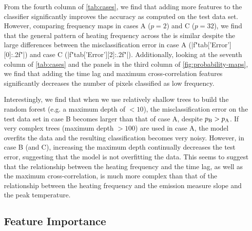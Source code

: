 From the fourth column of \autoref{tab:cases}, we find that adding more features to the classifier significantly improves the accuracy as computed on the test data set.
However, comparing frequency maps in cases A ($p=2$) and C ($p=32$), we find that the general pattern of heating frequency across the \AR{} is similar despite the large differences between the misclassification error in case A (\py[manager_ml]|f"{tab['Error'][0]:.2f}"|) and case C (\py[manager_ml]|f"{tab['Error'][2]:.2f}"|).
Additionally, looking at the seventh column of \autoref{tab:cases} and the panels in the third column of \autoref{fig:probability-maps}, we find that adding the time lag and maximum cross-correlation features significantly decreases the number of pixels classified as low frequency.

Interestingly, we find that when we use relatively shallow trees to build the random forest (e.g. a maximum depth of $<10$), the misclassification error on the test data set in case B becomes larger than that of case A, despite $p_\textup{B}>p_\textup{A}$.
If very complex trees (maximum depth $>100$) are used in case A, the model overfits the data and the resulting classification becomes very noisy. 
However, in case B (and C), increasing the maximum depth continually decreases the test error, suggesting that the model is not overfitting the data. 
This seems to suggest that the relationship between the heating frequency and the time lag, as well as the maximum cross-correlation, is much more complex than that of the relationship between the heating frequency and the emission measure slope and the peak temperature.

\subsection{Feature Importance}\label{sec:feature-importance}

